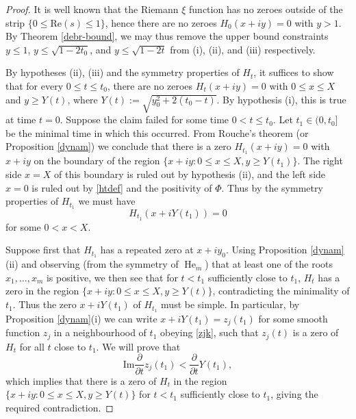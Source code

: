 \begin{proof}  It is well known that the Riemann $\xi$ function has no zeroes outside of the strip $\{ 0 \leq \mathrm{Re}(s) \leq 1 \}$, hence there are no zeroes $H_0(x+iy)=0$ with $y > 1$.  By Theorem \ref{debr-bound}, we may thus remove the upper bound constraints $y \leq 1$, $y \leq \sqrt{1-2t_0}$, and $y \leq \sqrt{1-2t}$ from (i), (ii), and (iii) respectively.

By hypotheses (ii), (iii) and the symmetry properties of $H_t$, it suffices to show that for every $0 \leq t \leq t_0$, there are no zeroes $H_t(x+iy) = 0$ with $0 \leq x \leq X$ and $y \geq Y(t)$, where $Y(t) := \sqrt{y_0^2 + 2(t_0-t)}$.  By hypothesis (i), this is true at time $t=0$.  Suppose the claim failed for some time $0 < t \leq t_0$.  Let $t_1 \in (0,t_0]$ be the minimal time in which this occurred.  From Rouche's theorem (or Proposition \ref{dynam}) we conclude that there is a zero $H_{t_1}(x+iy)=0$ with $x+iy$ on the boundary of the region $\{ x+iy: 0 \leq	 x \leq X, y \geq Y(t_1) \}$.  The right side $x=X$ of this boundary is ruled out by hypothesis (ii), and the left side $x=0$ is ruled out by \eqref{htdef} and the positivity of $\Phi$.  Thus by the symmetry properties of $H_{t_1}$ we must have
$$ H_{t_1}(x+iY(t_1)) = 0$$
for some $0 < x < X$.

Suppose first that $H_{t_1}$ has a repeated zero at $x+iy_0$.  Using Proposition \ref{dynam}(ii) and observing (from the symmetry of $\operatorname{He}_m$) that at least one of the roots $x_1,\dots,x_m$ is positive, we then see that for $t<t_1$ sufficiently close to $t_1$, $H_t$ has a zero in the region $\{ x+iy: 0 \leq x \leq X, y \geq Y(t) \}$, contradicting the minimality of $t_1$.  Thus the zero $x+i Y(t_1)$ of $H_{t_1}$ must be simple.  In particular, by Proposition \ref{dynam}(i) we can write $x+i Y(t_1) = z_j(t_1)$ for some smooth function $z_j$ in a neighbourhood of $t_1$ obeying \eqref{zjk}, such that $z_j(t)$ is a zero of $H_t$ for all $t$ close to $t_1$.  We will prove that
\begin{equation}\label{im}
\mathrm{Im} \frac{\partial}{\partial t} z_j( t_1 ) < \frac{\partial}{\partial t} Y(t_1),
\end{equation}
which implies that there is a zero of $H_t$ in the region $\{ x+iy: 0 \leq x \leq X, y \geq Y(t) \}$  for $t<t_1$ sufficiently close to $t_1$, giving the required contradiction.  


\end{proof}
